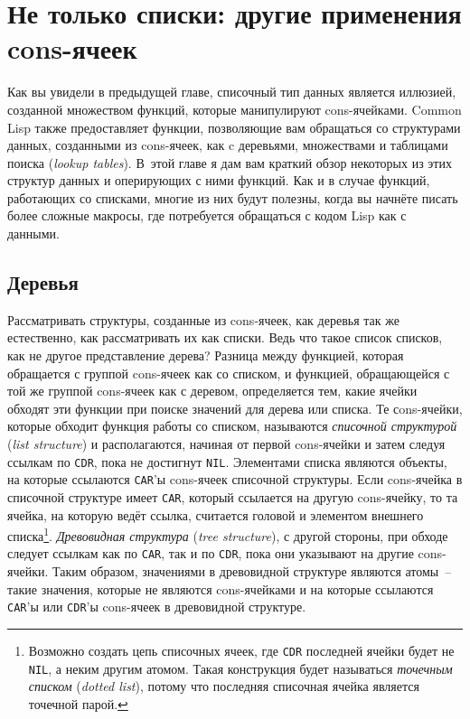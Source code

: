 \chapter{Не только списки: другие применения cons-ячеек}
\label{ch:13}

\thispagestyle{empty}

Как вы увидели в предыдущей главе, списочный тип данных является иллюзией, созданной
множеством функций, которые манипулируют cons-ячейками. Common Lisp также предоставляет
функции, позволяющие вам обращаться со структурами данных, созданными из cons-ячеек, как c
деревьями, множествами и таблицами поиска (\textit{lookup tables}). В~этой главе я дам
вам краткий обзор некоторых из этих структур данных и оперирующих с ними функций. Как и в
случае функций, работающих со списками, многие из них будут полезны, когда вы начнёте
писать более сложные макросы, где потребуется обращаться с кодом Lisp как с данными.

\section{Деревья}

Рассматривать структуры, созданные из cons-ячеек, как деревья так же естественно, как
рассматривать их как списки. Ведь что такое список списков, как не другое представление
дерева?  Разница между функцией, которая обращается с группой cons-ячеек как со списком, и
функцией, обращающейся с той же группой cons-ячеек как с деревом, определяется тем, какие
ячейки обходят эти функции при поиске значений для дерева или списка. Те сons-ячейки,
которые обходит функция работы со списком, называются \textit{списочной структурой}
(\textit{list structure}) и
располагаются, начиная от первой cons-ячейки и затем следуя ссылкам по \lstinline{CDR}, пока не
достигнут \lstinline{NIL}.  Элементами списка являются объекты, на которые ссылаются
\lstinline{CAR}'ы cons-ячеек списочной структуры. Если cons-ячейка в списочной структуре имеет
\lstinline{CAR}, который ссылается на другую cons-ячейку, то та ячейка, на которую ведёт
ссылка, считается головой и элементом внешнего списка\footnote{Возможно создать цепь
  списочных ячеек, где \lstinline{CDR} последней ячейки будет не \lstinline{NIL}, а неким другим
  атомом. Такая конструкция будет называться \textit{точечным списком} (\textit{dotted
    list}), потому что последняя списочная ячейка является точечной парой.}\hspace{\footnotenegspace}.
\textit{Древовидная структура} (\textit{tree structure}), с другой стороны, при обходе следует
ссылкам как по \lstinline{CAR}, так и по \lstinline{CDR}, пока они указывают на другие cons-ячейки. Таким
образом, значениями в древовидной структуре являются атомы~-- такие значения, которые не
являются cons-ячейками и на которые ссылаются \lstinline{CAR}'ы или \lstinline{CDR}'ы cons-ячеек в
древовидной структуре.

